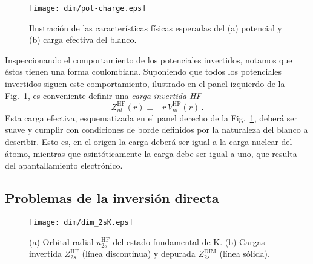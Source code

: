 \begin{figure}[t!]
\centering
\texttt{[image: dim/pot-charge.eps]}
\vspace{-0.3cm}
\caption[Características físicas del potencial y carga efectiva.]
{Ilustración de las características físicas esperadas del (a) potencial 
y (b) carga efectiva del blanco.}
\label{fig:potycharge}
\end{figure}

Inspeccionando el comportamiento de los potenciales invertidos, notamos 
que éstos tienen una forma coulombiana. Suponiendo que todos los 
potenciales invertidos siguen este comportamiento, ilustrado en el panel
izquierdo de la Fig.~\ref{fig:potycharge}, es conveniente definir una 
\textit{carga invertida HF} 
\begin{equation}
Z_{nl}^{\mathrm{HF}}(r) \equiv -r \, V_{nl}^{\mathrm{HF}}(r) \,.
\label{eq:Zeff}
\end{equation}
Esta carga efectiva, esquematizada en el panel derecho de la 
Fig.~\ref{fig:potycharge}, deberá ser suave y cumplir con condiciones de 
borde definidos por la naturaleza del blanco a describir. Esto es, en el 
origen la carga deberá ser igual a la carga nuclear del átomo, mientras 
que asintóticamente la carga debe ser igual a uno, que resulta del 
apantallamiento electrónico.

\subsection{Problemas de la inversión directa}
\label{subsec:probinv}

\begin{figure}
\centering
\texttt{[image: dim/dim\_2sK.eps]} 
\vspace{-0.3cm}
\caption[Orbital radial y carga efectiva correspondiente.]
{(a) Orbital radial $u_{2s}^{\mathrm{HF}}$ del estado fundamental de K.
(b) Cargas invertida $Z_{2s}^{\mathrm{HF}}$ (línea discontinua) 
y depurada $Z_{2s}^{\mathrm{DIM}}$ (línea sólida).}
\label{fig:2sK}
\end{figure}

